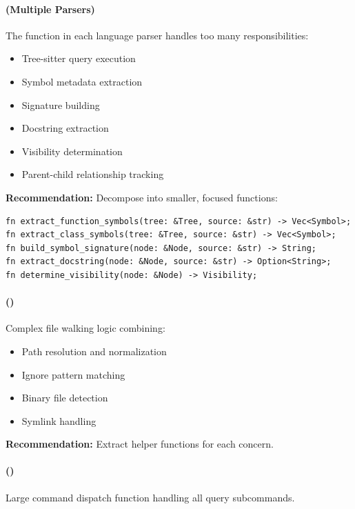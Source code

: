 \paragraph{ (Multiple Parsers)}
The  function in each language parser handles too many responsibilities:

\begin{itemize}
    \item Tree-sitter query execution
    \item Symbol metadata extraction
    \item Signature building
    \item Docstring extraction
    \item Visibility determination
    \item Parent-child relationship tracking
\end{itemize}

\textbf{Recommendation:} Decompose into smaller, focused functions:

\begin{lstlisting}[style=rustcode, caption={Proposed refactoring for extract\_symbols}]
fn extract_function_symbols(tree: &Tree, source: &str) -> Vec<Symbol>;
fn extract_class_symbols(tree: &Tree, source: &str) -> Vec<Symbol>;
fn build_symbol_signature(node: &Node, source: &str) -> String;
fn extract_docstring(node: &Node, source: &str) -> Option<String>;
fn determine_visibility(node: &Node) -> Visibility;
\end{lstlisting}

\paragraph{ ()}
Complex file walking logic combining:

\begin{itemize}
    \item Path resolution and normalization
    \item Ignore pattern matching
    \item Binary file detection
    \item Symlink handling
\end{itemize}

\textbf{Recommendation:} Extract helper functions for each concern.

\paragraph{ ()}
Large command dispatch function handling all query subcommands.

